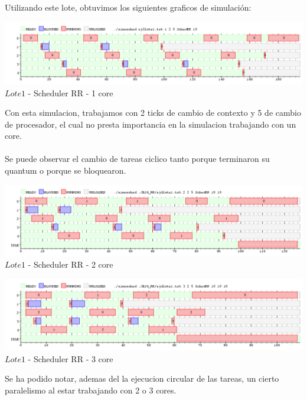 Utilizando este lote, obtuvimos los siguientes graficos de simulación:\\
\begin{center}

    
	\includegraphics[width=450pt]{./EJ4_RR/ejercicio4-1nucleo.png}
	{$Lote 1$ - Scheduler RR - 1 core}	
 
\end{center}


\indent Con esta simulacion, trabajamos con 2 ticks de cambio de contexto y 5 de cambio de procesador, el cual no presta importancia
en la simulacion trabajando con un core.\\
\\
\indent Se puede observar el cambio de tareas ciclico tanto porque terminaron su quantum o porque se bloquearon.\\

\begin{center}
  	\includegraphics[width=450pt]{./EJ4_RR/ejercicio4-2nucleo.png}
	  {$Lote 1$ - Scheduler RR - 2 core}	
\end{center}

\begin{center}
  	\includegraphics[width=450pt]{./EJ4_RR/ejercicio4-3nucleo.png}
	  {$Lote 1$ - Scheduler RR - 3 core}	
\end{center}

\indent Se ha podido notar, ademas del la ejecucion circular de las tareas, un cierto paralelismo al estar trabajando con
2 o 3 cores.\\

